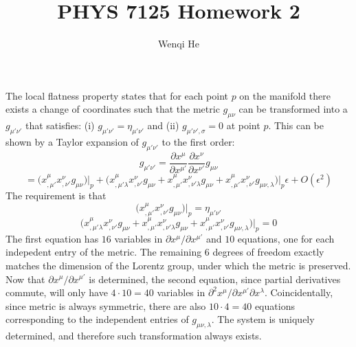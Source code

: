 \documentclass{article}
\title{PHYS 7125 Homework 2}
\author{Wenqi He}
\begin{document}
\maketitle
\section{}
The local flatness property states that for each point $p$ on the manifold there exists a change of coordinates such that the metric $g_{\mu\nu}$ can be transformed into a $g_{\mu'\nu'}$ that satisfies: (i) $g_{\mu'\nu'} = \eta_{\mu'\nu'}$ and (ii) $g_{\mu'\nu',\sigma} = 0$ at point $p$. This can be shown by a Taylor expansion of $g_{\mu'\nu'}$ to the first order:
\[ g_{\mu'\nu'} = \frac{\partial x^\mu}{\partial x^{\mu'}}\frac{\partial x^\nu}{\partial x^{\nu'}} g_{\mu\nu} \]
\[ = \Big(x^\mu_{,\mu'} x^\nu_{,\nu'} g_{\mu\nu}\Big)\Big\rvert_p
	+ \Bigg( x^\mu_{,\mu'\lambda} x^\nu_{,\nu'} g_{\mu\nu}
	+ x^\mu_{,\mu'}x^\nu_{,\nu'\lambda}g_{\mu\nu}
	+ x^\mu_{,\mu'}x^\nu_{,\nu'} g_{\mu\nu,\lambda}\Bigg)\Big\rvert_p \epsilon + O(\epsilon^2) \]
The requirement is that 
\[ \Big(x^\mu_{,\mu'} x^\nu_{,\nu'} g_{\mu\nu}\Big)\Big\rvert_p = \eta_{\mu'\nu'} \]
\[ \Bigg( x^\mu_{,\mu'\lambda} x^\nu_{,\nu'} g_{\mu\nu}
	+ x^\mu_{,\mu'}x^\nu_{,\nu'\lambda}g_{\mu\nu}
	+ x^\mu_{,\mu'}x^\nu_{,\nu'} g_{\mu\nu,\lambda}\Bigg)\Big\rvert_p = 0 \]
The first equation has $16$ variables in $\partial x^\mu/\partial x^{\mu'}$ and $10$ equations, one for each indepedent entry of the metric. The remaining 6 degrees of freedom exactly matches the dimension of the Lorentz group, under which the metric is preserved. Now that $\partial x^\mu/\partial x^{\mu'}$ is determined, the second equation, since partial derivatives commute, will only have $4 \cdot 10 = 40$ variables in $\partial^2x^\mu/\partial x^{\mu'}\partial x^\lambda$. Coincidentally, since metric is always symmetric, there are also $10 \cdot 4 = 40$ equations corresponding to the independent entries of $g_{\mu\nu,\lambda}$. The system is uniquely determined, and therefore such transformation always exists.

\section{}
\end{document}
